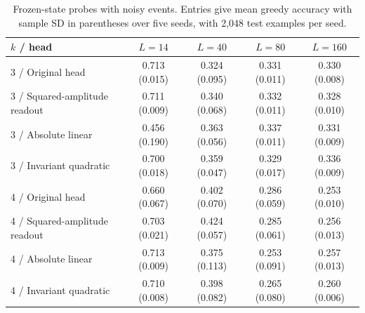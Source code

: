 \begin{table}[H]
\centering\small
\caption{Frozen-state probes with noisy events. Entries give mean greedy accuracy
with sample SD in parentheses over five seeds, with 2,048 test examples per seed.}
\label{tab:newfrozen}
\setlength{\tabcolsep}{3pt}
\begin{tabular}{lcccc}
\toprule
$k$ / head & $L=14$ & $L=40$ & $L=80$ & $L=160$ \\
\midrule
3 / Original head & 0.713 (0.015) & 0.324 (0.095) & 0.331 (0.011) & 0.330 (0.008) \\
3 / Squared-amplitude readout & 0.711 (0.009) & 0.340 (0.068) & 0.332 (0.011) & 0.328 (0.010) \\
3 / Absolute linear & 0.456 (0.190) & 0.363 (0.056) & 0.337 (0.011) & 0.331 (0.009) \\
3 / Invariant quadratic & 0.700 (0.018) & 0.359 (0.047) & 0.329 (0.017) & 0.336 (0.009) \\
4 / Original head & 0.660 (0.067) & 0.402 (0.070) & 0.286 (0.059) & 0.253 (0.010) \\
4 / Squared-amplitude readout & 0.703 (0.021) & 0.424 (0.057) & 0.285 (0.061) & 0.256 (0.013) \\
4 / Absolute linear & 0.713 (0.009) & 0.375 (0.113) & 0.253 (0.091) & 0.257 (0.013) \\
4 / Invariant quadratic & 0.710 (0.008) & 0.398 (0.082) & 0.265 (0.080) & 0.260 (0.006) \\
\bottomrule
\end{tabular}
\end{table}

\FloatBarrier
